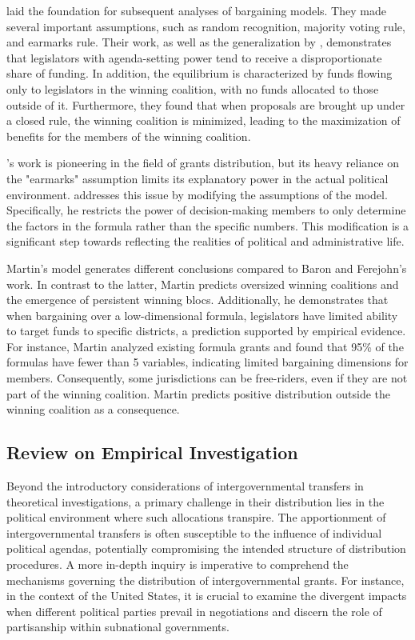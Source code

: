 \documentclass[man]{apa7}
\begin{document}
\Textcite{baron1989bargaining} laid the foundation for subsequent analyses of bargaining models. They made several important assumptions, such as random recognition, majority voting rule, and earmarks rule. Their work, as well as the generalization by \Textcite{banks2006general}, demonstrates that legislators with agenda-setting power tend to receive a disproportionate share of funding. In addition, the equilibrium is characterized by funds flowing only to legislators in the winning coalition, with no funds allocated to those outside of it. Furthermore, they found that when proposals are brought up under a closed rule, the winning coalition is minimized, leading to the maximization of benefits for the members of the winning coalition.

\Textcite{baron1989bargaining}'s work is pioneering in the field of grants distribution, but its heavy reliance on the "earmarks" assumption limits its explanatory power in the actual political environment. \Textcite{martin2018dividing} addresses this issue by modifying the assumptions of the model. Specifically, he restricts the power of decision-making members to only determine the factors in the formula rather than the specific numbers. This modification is a significant step towards reflecting the realities of political and administrative life.

Martin's model generates different conclusions compared to Baron and Ferejohn's work. In contrast to the latter, Martin predicts oversized winning coalitions and the emergence of persistent winning blocs. Additionally, he demonstrates that when bargaining over a low-dimensional formula, legislators have limited ability to target funds to specific districts, a prediction supported by empirical evidence. For instance, Martin analyzed existing formula grants and found that 95\% of the formulas have fewer than 5 variables, indicating limited bargaining dimensions for members. Consequently, some jurisdictions can be free-riders, even if they are not part of the winning coalition. Martin predicts positive distribution outside the winning coalition as a consequence.%

\subsection{Review on Empirical Investigation}

Beyond the introductory considerations of intergovernmental transfers in theoretical investigations, a primary challenge in their distribution lies in the political environment where such allocations transpire. The apportionment of intergovernmental transfers is often susceptible to the influence of individual political agendas, potentially compromising the intended structure of distribution procedures. A more in-depth inquiry is imperative to comprehend the mechanisms governing the distribution of intergovernmental grants. For instance, in the context of the United States, it is crucial to examine the divergent impacts when different political parties prevail in negotiations and discern the role of partisanship within subnational governments.
\end{document}

